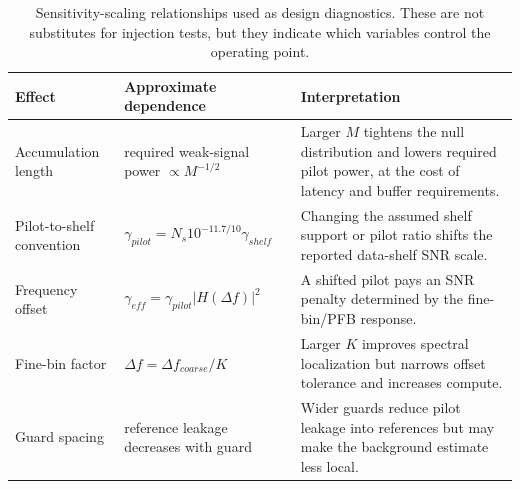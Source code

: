 \begin{table}[ht]
\centering
\caption{Sensitivity-scaling relationships used as design diagnostics. These are not substitutes for injection tests, but they indicate which variables control the operating point.}
\label{tab:scaling-laws}
\begin{tabularx}{\textwidth}{l l Y}
\toprule
Effect & Approximate dependence & Interpretation \\
\midrule
Accumulation length & required weak-signal power $\propto M^{-1/2}$ & Larger $M$ tightens the null distribution and lowers required pilot power, at the cost of latency and buffer requirements. \\
Pilot-to-shelf convention & $\gamma_{pilot}=N_s10^{-11.7/10}\gamma_{shelf}$ & Changing the assumed shelf support or pilot ratio shifts the reported data-shelf SNR scale. \\
Frequency offset & $\gamma_{eff}=\gamma_{pilot}|H(\Delta f)|^2$ & A shifted pilot pays an SNR penalty determined by the fine-bin/PFB response. \\
Fine-bin factor & $\Delta f=\Delta f_{coarse}/K$ & Larger $K$ improves spectral localization but narrows offset tolerance and increases compute. \\
Guard spacing & reference leakage decreases with guard & Wider guards reduce pilot leakage into references but may make the background estimate less local. \\
\bottomrule
\end{tabularx}
\end{table}
